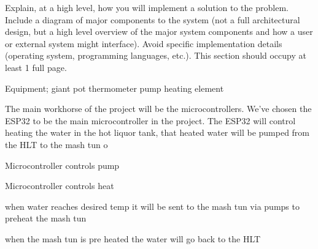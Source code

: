 Explain, at a high level, how you will implement a solution to the problem. Include a diagram of major components to the system (not a full architectural design, but a high level overview of the major system components and how a user or external system might interface). Avoid specific implementation details (operating system, programming languages, etc.). This section should occupy at least 1 full page.

\vspace{5mm}

Equipment;
giant pot
thermometer
pump
heating element


The main workhorse of the project will be the microcontrollers. We've chosen the ESP32 to be the main microcontroller in the project. The ESP32 will control heating the water in the hot liquor tank, that heated water will be pumped from the HLT to the mash tun
o

Microcontroller controls pump

Microcontroller controls heat

when water reaches desired temp it will be sent to the mash tun via pumps to preheat the mash tun

when the mash tun is pre heated the water will go back to the HLT


